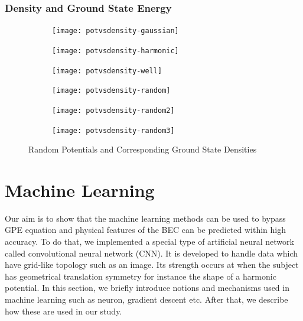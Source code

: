 \documentclass[a4paper,times,hidelinks,12pt]{article}
\begin{document}
\subsubsection{Density and Ground State Energy}

\graphicspath{{"../figs/potentials/"}}
\begin{figure}[H]
    \centering
    \begin{subfigure}[t]{0.45\textwidth}
        \texttt{[image: potvsdensity-gaussian]}
    \end{subfigure}
    \begin{subfigure}[t]{0.45\textwidth}
        \texttt{[image: potvsdensity-harmonic]}
    \end{subfigure}
    \begin{subfigure}[t]{0.45\textwidth}
        \texttt{[image: potvsdensity-well]}
    \end{subfigure}
    \begin{subfigure}[t]{0.45\textwidth}
        \texttt{[image: potvsdensity-random]}
    \end{subfigure}
    \begin{subfigure}[t]{0.45\textwidth}
        \texttt{[image: potvsdensity-random2]}
    \end{subfigure}
    \begin{subfigure}[t]{0.45\textwidth}
        \texttt{[image: potvsdensity-random3]}
    \end{subfigure}
\caption{Random Potentials and Corresponding Ground State Densities}
\label{fig:random3_before_after}
\end{figure}



\section{Machine Learning}
\label{sec:machine_learning}

Our aim is to show that the machine learning methods can be used to bypass GPE equation and physical features of the BEC can be predicted within high accuracy. To do that, we implemented a special type of artificial neural network called convolutional neural network (CNN). It is developed to handle data which have grid-like topology \cite{goodfellow2016deep} such as an image. Its strength occurs at when the subject has geometrical translation symmetry for instance the shape of a harmonic potential. In this section, we briefly introduce notions and mechanisms used in machine learning such as neuron, gradient descent etc. After that, we describe how these are used in our study.  
\end{document}
